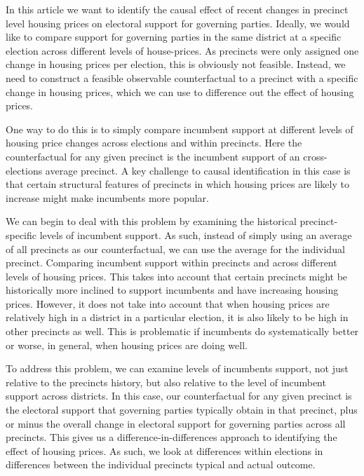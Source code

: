 \documentclass[12pt,a4paper]{article}
\begin{document}
In this article we want to identify the causal effect of recent changes in precinct level housing prices on electoral support for governing parties. Ideally, we would like to compare support for governing parties in the same district at a specific election across different levels of house-prices. As precincts were only assigned one change in housing prices per election, this is obviously not feasible. Instead, we need to construct a feasible observable counterfactual to a precinct with a specific change in housing prices, which we can use to difference out the effect of housing prices. 

One way to do this is to simply compare incumbent support at different levels of housing price changes across elections and within precincts. Here the counterfactual for any given precinct is the incumbent support of an cross-elections average precinct. A key challenge to causal identification in this case is that certain structural features of precincts in which housing prices are likely to increase might make incumbents more popular. 

We can begin to deal with this problem by examining the historical precinct-specific levels of incumbent support. As such, instead of simply using an average of all precincts as our counterfactual, we can use the average for the individual precinct. Comparing incumbent support within precincts and across different levels of housing prices. This takes into account that certain precincts might be historically more inclined to support incumbents and have increasing housing prices. However, it does not take into account that when housing prices are relatively high in a district in a particular election, it is also likely to be high in other precincts as well. This is problematic if incumbents do systematically better or worse, in general, when housing prices are doing well.

To address this problem, we can examine levels of incumbents support, not just relative to the precincts history, but also relative to the level of incumbent support across districts. In this case, our counterfactual for any given precinct is the electoral support that governing parties typically obtain in that precinct, plus or minus the overall change in electoral support for governing parties across all precincts. This gives us a difference-in-differences approach to identifying the effect of housing prices. As such, we look at differences within elections in differences between the individual precincts typical and actual outcome.
\end{document}
